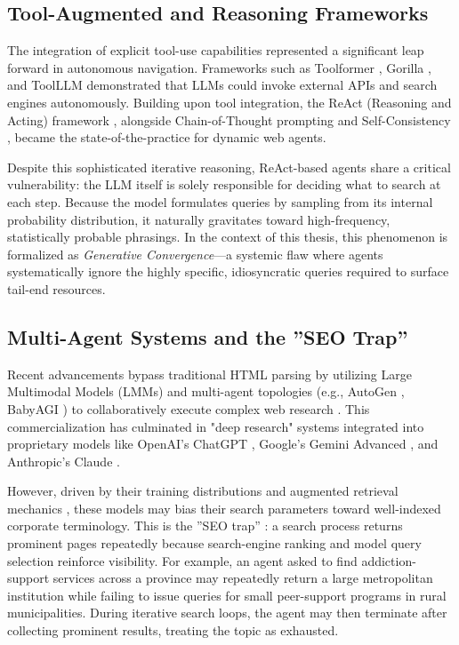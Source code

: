 \documentclass[12pt,oneside]{report}
\begin{document}
\subsection{Tool-Augmented and Reasoning Frameworks}
The integration of explicit tool-use capabilities represented a significant leap forward in autonomous navigation. Frameworks such as Toolformer \cite{13}, Gorilla \cite{14}, and ToolLLM \cite{8} demonstrated that LLMs could invoke external APIs and search engines autonomously. Building upon tool integration, the ReAct (Reasoning and Acting) framework \cite{15}, alongside Chain-of-Thought prompting \cite{16} and Self-Consistency \cite{17}, became the state-of-the-practice for dynamic web agents. 

Despite this sophisticated iterative reasoning, ReAct-based agents share a critical vulnerability: the LLM itself is solely responsible for deciding what to search at each step. Because the model formulates queries by sampling from its internal probability distribution, it naturally gravitates toward high-frequency, statistically probable phrasings. In the context of this thesis, this phenomenon is formalized as \textit{Generative Convergence}—a systemic flaw where agents systematically ignore the highly specific, idiosyncratic queries required to surface tail-end resources.

\subsection{Multi-Agent Systems and the ''SEO Trap''}
Recent advancements bypass traditional HTML parsing by utilizing Large Multimodal Models (LMMs) \cite{18} and multi-agent topologies (e.g., AutoGen \cite{19}, BabyAGI \cite{20}) to collaboratively execute complex web research \cite{9}. This commercialization has culminated in "deep research" systems integrated into proprietary models like OpenAI's ChatGPT \cite{21}, Google's Gemini Advanced \cite{22}, and Anthropic's Claude \cite{23}. 

However, driven by their training distributions and augmented retrieval mechanics \cite{25}, these models may bias their search parameters toward well-indexed corporate terminology. This is the ''SEO trap'' \cite{24}: a search process returns prominent pages repeatedly because search-engine ranking and model query selection reinforce visibility. For example, an agent asked to find addiction-support services across a province may repeatedly return a large metropolitan institution while failing to issue queries for small peer-support programs in rural municipalities. During iterative search loops, the agent may then terminate after collecting prominent results, treating the topic as exhausted.
\end{document}
